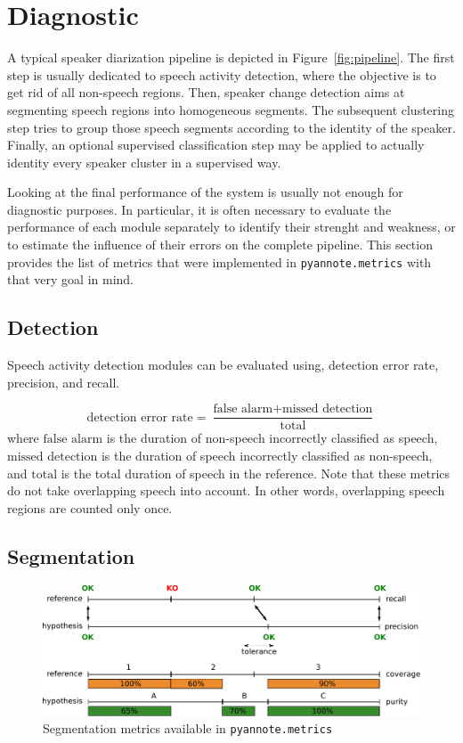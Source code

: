 \documentclass[a4paper]{article}
\newcommand*\metrics{\texttt{\footnotesize{pyannote.metrics}}}
\begin{document}
\section{Diagnostic}
\label{sec:diagnostic}

A typical speaker diarization pipeline is depicted in Figure~\ref{fig:pipeline}.
The first step is usually dedicated to speech activity detection, where the objective is to get rid of all non-speech regions.
Then, speaker change detection aims at segmenting speech regions into homogeneous segments.
The subsequent clustering step tries to group those speech segments according to the identity of the speaker.
Finally, an optional supervised classification step may be applied to actually identity every speaker cluster in a supervised way.

Looking at the final performance of the system is usually not enough for diagnostic purposes.
In particular, it is often necessary to evaluate the performance of each module separately to identify their strenght and weakness, or to estimate the influence of their errors on the complete pipeline.
This section provides the list of metrics that were implemented in \metrics{} with that very goal in mind.

\subsection{Detection}

Speech activity detection modules can be evaluated using, detection error rate, precision, and recall.

\begin{equation}
  \text{detection error rate} = \frac{\text{false alarm} + \text{missed detection}}{\text{total}}
\end{equation}
where $\text{false alarm}$ is the duration of non-speech incorrectly classified as speech, $\text{missed detection}$ is the duration of
speech incorrectly classified as non-speech, and $\text{total}$ is the total duration of speech in the reference.
Note that these metrics do not take overlapping speech into account.
In other words, overlapping speech regions are counted only once.

\subsection{Segmentation}

\begin{figure}[htb]
  \centering
  \includegraphics[width=1.0\linewidth]{figures/segmentation.pdf}
  \caption{Segmentation metrics available in \metrics{}}
  \label{fig:segmentation}
\end{figure}
\end{document}
